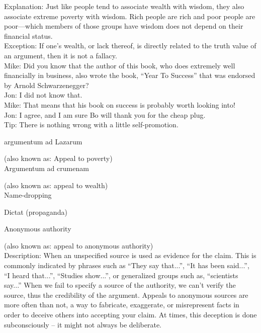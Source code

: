 \documentclass[a4paper,12pt,single,pdftex]{scrartcl}
\begin{document}
{    
      Explanation: Just like people tend to associate wealth with wisdom, they also associate extreme poverty with wisdom.  Rich people are rich and poor people are poor—which members of those groups have wisdom does not depend on their financial status.
    \\

    
      Exception: If one’s wealth, or lack thereof, is directly related to the truth value of an argument, then it is not a fallacy.
    \\

    
      Mike: Did you know that the author of this book, who does extremely well financially in business, also wrote the book, “Year To Success” that was endorsed by Arnold Schwarzenegger?
    \\

    
      Jon: I did not know that.
    \\

    
      Mike: That means that his book on success is probably worth looking into!
    \\

    
      Jon: I agree, and I am sure Bo will thank you for the cheap plug.
    \\

    
      Tip: There is nothing wrong with a little self-promotion.
    \\

  }


argumentum ad Lazarum
    
      (also known as: Appeal to poverty)
    \\

  

Argumentum ad crumenam
    
      (also known as: appeal to wealth)
    \\

  

Name-dropping

Dictat (propaganda)

Anonymous authority
    
      (also known as: appeal to anonymous authority)
    \\

  
    Description: When an unspecified source is used as evidence for the claim.  This is commonly indicated by phrases such as “They say that...”, “It has been said...”, “I heard that...”, “Studies show...”, or generalized groups such as, “scientists say...”  When we fail to specify a source of the authority, we can’t verify the source, thus the credibility of the argument.  Appeals to anonymous sources are more often than not, a way to fabricate, exaggerate, or misrepresent facts in order to deceive others into accepting your claim.  At times, this deception is done subconsciously -- it might not always be deliberate.
\end{document}
